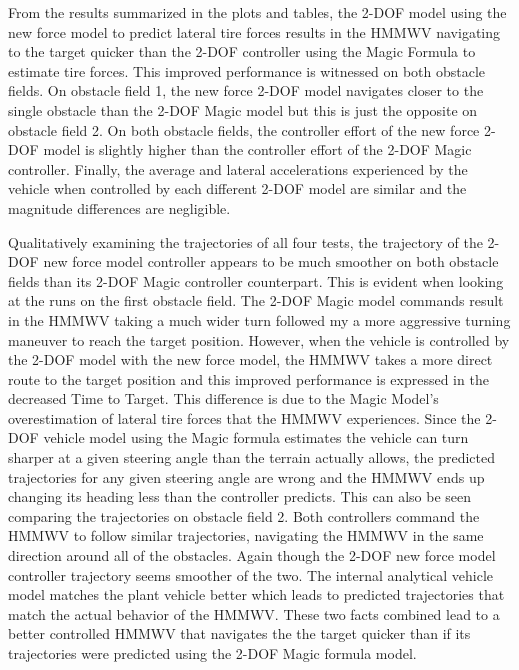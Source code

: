 \documentclass[12pt,onecolumn]{report}
\begin{document}
From the results summarized in the plots and tables, the 2-DOF model using the new force model to predict lateral tire forces results in the HMMWV navigating to the target quicker than the 2-DOF controller using the Magic Formula to estimate tire forces. This improved performance is witnessed on both obstacle fields. On obstacle field 1, the new force 2-DOF model navigates closer to the single obstacle than the 2-DOF Magic model but this is just the opposite on obstacle field 2. On both obstacle fields, the controller effort of the new force 2-DOF model is slightly higher than the controller effort of the 2-DOF Magic controller. Finally, the average and lateral accelerations experienced by the vehicle when controlled by each different 2-DOF model are similar and the magnitude differences are negligible. 

Qualitatively examining the trajectories of all four tests, the trajectory of the 2-DOF new force model controller appears to be much smoother on both obstacle fields than its 2-DOF Magic controller counterpart. This is evident when looking at the runs on the first obstacle field. The 2-DOF Magic model commands result in the HMMWV taking a much wider turn followed my a more aggressive turning maneuver to reach the target position. However, when the vehicle is controlled by the 2-DOF model with the new force model, the HMMWV takes a more direct route to the target position and this improved performance is expressed in the decreased Time to Target. This difference is due to the Magic Model's overestimation of lateral tire forces that the HMMWV experiences. Since the 2-DOF vehicle model using the Magic formula estimates the vehicle can turn sharper at a given steering angle than the terrain actually allows, the predicted trajectories for any given steering angle are wrong and the HMMWV ends up changing its heading less than the controller predicts. This can also be seen comparing the trajectories on obstacle field 2. Both controllers command the HMMWV to follow similar trajectories, navigating the HMMWV in the same direction around all of the obstacles. Again though the 2-DOF new force model controller trajectory seems smoother of the two. The internal analytical vehicle model matches the plant vehicle better which leads to predicted trajectories that match the actual behavior of the HMMWV. These two facts combined lead to a better controlled HMMWV that navigates the the target quicker than if its trajectories were predicted using the 2-DOF Magic formula model. 
\end{document}
